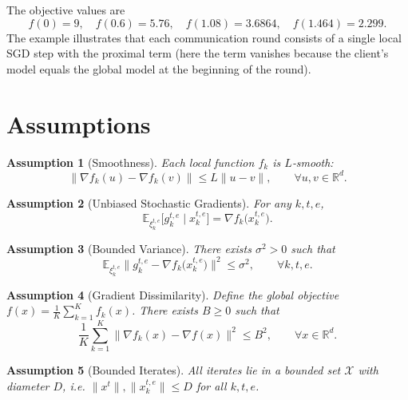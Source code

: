 \documentclass{article}
\newtheorem{assumption}{Assumption}[section]
\begin{document}
The objective values are
\[
f(0)=9,\quad f(0.6)=5.76,\quad f(1.08)=3.6864,\quad f(1.464)=2.299.
\]
The example illustrates that each communication round consists of a single local SGD step with the proximal term (here the term vanishes because the client’s model equals the global model at the beginning of the round).

\section*{Assumptions}
\begin{assumption}[Smoothness]\label{ass:smooth}
Each local function $f_k$ is $L$‑smooth:
\[
\|\nabla f_k(u)-\nabla f_k(v)\|\le L\|u-v\|,\qquad\forall u,v\in\mathbb{R}^{d}.
\]
\end{assumption}

\begin{assumption}[Unbiased Stochastic Gradients]\label{ass:unbiased}
For any $k,t,e$,
\[
\mathbb{E}_{\xi_{k}^{t,e}}\!\bigl[g_{k}^{t,e}\mid x_{k}^{t,e}\bigr]
    =\nabla f_k\!\bigl(x_{k}^{t,e}\bigr).
\]
\end{assumption}

\begin{assumption}[Bounded Variance]\label{ass:variance}
There exists $\sigma^{2}>0$ such that
\[
\mathbb{E}_{\xi_{k}^{t,e}}\!\bigl\|g_{k}^{t,e}
    -\nabla f_k\!\bigl(x_{k}^{t,e}\bigr)\bigr\|^{2}
    \le\sigma^{2},
    \qquad\forall k,t,e.
\]
\end{assumption}

\begin{assumption}[Gradient Dissimilarity]\label{ass:dissimilarity}
Define the global objective $f(x)=\frac1K\sum_{k=1}^{K}f_k(x)$.  
There exists $B\ge0$ such that
\[
\frac{1}{K}\sum_{k=1}^{K}\bigl\|\nabla f_k(x)-\nabla f(x)\bigr\|^{2}
    \le B^{2},\qquad\forall x\in\mathbb{R}^{d}.
\]
\end{assumption}

\begin{assumption}[Bounded Iterates]\label{ass:bounded}
All iterates lie in a bounded set $\mathcal{X}$ with diameter $D$, i.e.
$\|x^{t}\|,\|x_{k}^{t,e}\|\le D$ for all $k,t,e$.
\end{assumption}

\end{document}
